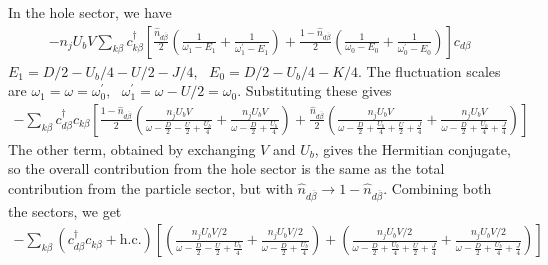 \documentclass[reprint,superscriptaddress,floatfix]{revtex4-2}
\begin{document}
\begin{widetext}
In the hole sector, we have
\begin{equation}\begin{aligned}
	-n_jU_b V\sum_{k\beta} c^\dagger_{k\beta} \left[\frac{\hat n_{d\overline\beta}}{2}\left(\frac{1}{\omega_1 - E_1} + \frac{1}{\omega^\prime_1 - E_1}\right) + \frac{1-\hat n_{d\overline\beta}}{2}\left(\frac{1}{\omega_0 - E_0} + \frac{1}{\omega_0^\prime - E_0}\right)\right] c_{d\beta}
\end{aligned}\end{equation}
\(E_1 = D/2 - U_b/4 - U/2 - J/4,~ ~ ~ E_0 = D/2 - U_b/4 - K/4\). The fluctuation scales are \(\omega_1 = \omega = \omega_0^\prime,~ ~ ~ \omega_1^\prime = \omega - U/2 = \omega_0\). Substituting these gives
\begin{equation}\begin{aligned}
	-\sum_{k\beta} c^\dagger_{d\beta} c_{k\beta} \left[\frac{1 - \hat n_{d\overline\beta}}{2}\left(\frac{n_jU_b V}{\omega - \frac{D}{2} - \frac{U}{2} + \frac{U_b}{4}} + \frac{n_jU_b V}{\omega - \frac{D}{2} + \frac{U_b}{4}}\right) + \frac{\hat n_{d\overline\beta}}{2}\left(\frac{n_jU_b V}{\omega - \frac{D}{2} + \frac{U_b}{4} + \frac{U}{2} + \frac{J}{4}} + \frac{n_jU_b V}{\omega - \frac{D}{2} + \frac{U_b}{4} + \frac{J}{4}}\right)\right]
\end{aligned}\end{equation}
The other term, obtained by exchanging \(V\) and \(U_b\), gives the Hermitian conjugate, so the overall contribution from the hole sector is the same as the total contribution from the particle sector, but with \(\hat n_{d\overline\beta} \to 1 - \hat n_{d\overline\beta}\). Combining both the sectors, we get
\begin{equation}\begin{aligned}
	-\sum_{k\beta} \left(c^\dagger_{d\beta} c_{k\beta} + \text{h.c.}\right) \left[\left(\frac{n_jU_b V/2}{\omega - \frac{D}{2} - \frac{U}{2} + \frac{U_b}{4}} + \frac{n_jU_b V/2}{\omega - \frac{D}{2} + \frac{U_b}{4}}\right) + \left(\frac{n_jU_b V/2}{\omega - \frac{D}{2} + \frac{U_b}{4} + \frac{U}{2} + \frac{J}{4}} + \frac{n_jU_b V/2}{\omega - \frac{D}{2} + \frac{U_b}{4} + \frac{J}{4}}\right)\right]
\end{aligned}\end{equation}


\end{widetext}
\end{document}
